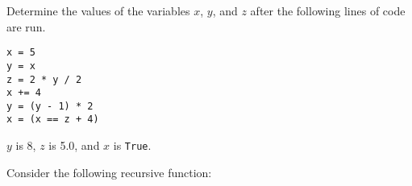 \documentclass[12pt]{exam}
\begin{document}
\begin{questions}

\question Determine the values of the variables $x$, $y$, and $z$ after the following lines of code are run. 


\begin{lstlisting}
x = 5
y = x
z = 2 * y / 2
x += 4
y = (y - 1) * 2
x = (x == z + 4)
\end{lstlisting}

\begin{solution}
$y$ is 8, $z$ is 5.0, and $x$ is \lstinline{True}. 
\end{solution}

\question Consider the following recursive function: 



\end{questions}
\end{document}
